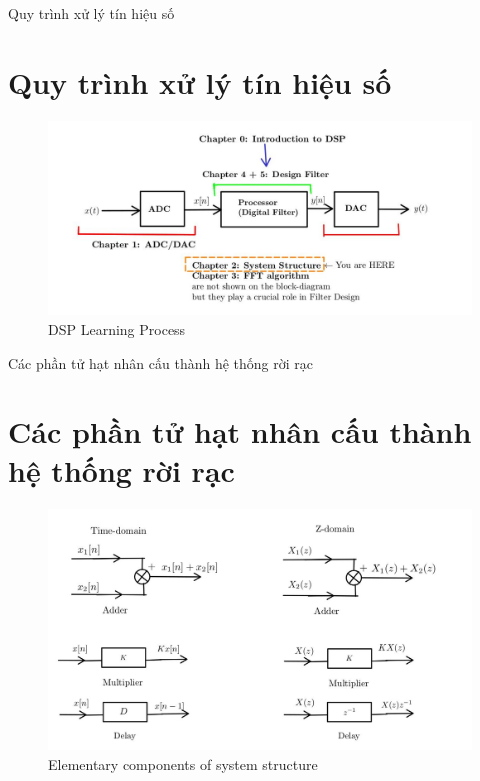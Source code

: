 \documentclass[8pt]{beamer}
\begin{document}
\begin{frame}{Quy trình xử lý tín hiệu số}
\section{Quy trình xử lý tín hiệu số}
\begin{figure}[h]
			\includegraphics[width=1.1\textwidth]{1.jpg}
			\caption{DSP Learning Process}			\label{fig:re1}
		\end{figure}

\end{frame}
\begin{frame}{Các phần tử hạt nhân cấu thành hệ thống rời rạc}
\section{Các phần tử hạt nhân cấu thành hệ thống rời rạc}
\begin{figure}[h]
			\includegraphics[width=1.1\textwidth]{2.jpg}
			\caption{Elementary components of system structure}			\label{fig:re2}
		\end{figure}
\end{frame}
\end{document}
